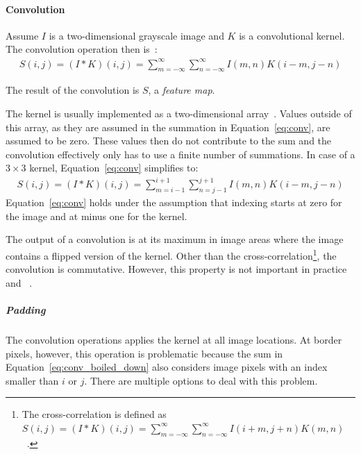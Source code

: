 \paragraph{Convolution}

Assume $I$ is a two-dimensional grayscale image and $K$ is a convolutional kernel.
The convolution operation then is~\citep[p. 327]{Goodfellow-et-al-2016}:
\begin{align}
    S(i, j)=(I * K)(i, j)=\sum_{m=-\infty}^{\infty} \sum_{n=-\infty}^{\infty} I(m, n) K(i-m, j-n) \label{eq:conv}
\end{align}

The result of the convolution is $S$, a \textit{feature map}.

The kernel is usually implemented as a two-dimensional array~\citep[p. 327]{Goodfellow-et-al-2016}.
Values outside of this array, as they are assumed in the summation in Equation~\ref{eq:conv}, are assumed to be zero.
These values then do not contribute to the sum and the convolution effectively only has to use a finite number of summations.
In case of a $3\times 3$ kernel, Equation~\ref{eq:conv} simplifies to:
\begin{align}
    S(i, j)=(I * K)(i, j)=\sum_{m=i-1}^{i+1} \sum_{n=j-1}^{j+1} I(m, n) K(i-m, j-n) \label{eq:conv_boiled_down}
\end{align}
Equation~\ref{eq:conv} holds under the assumption that indexing starts at zero for the image and at minus one for the kernel.

The output of a convolution is at its maximum in image areas where the image contains a flipped version of the kernel.
Other than the cross-correlation\footnote{The cross-correlation is defined as $S(i, j)=(I * K)(i, j)=\sum_{m=-\infty}^{\infty} \sum_{n=-\infty}^{\infty} I(i+m, j+n) K(m, n)$~\citep[p. 329]{Goodfellow-et-al-2016}.}, the convolution is commutative.
However, this property is not important in practice and ~\citep[p. 329]{Goodfellow-et-al-2016}.

\subparagraph{Padding}
The convolution operations applies the kernel at all image locations.
At border pixels, however, this operation is problematic because the sum in Equation~\ref{eq:conv_boiled_down} also considers image pixels with an index smaller than $i$ or $j$.
There are multiple options to deal with this problem.

